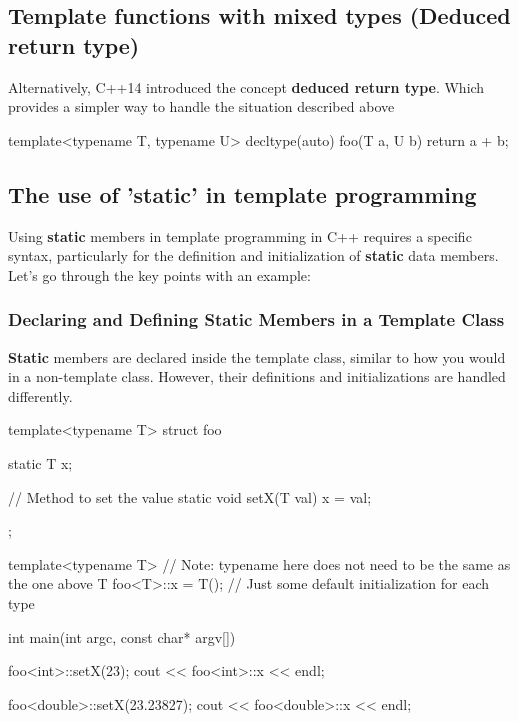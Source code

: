 \documentclass{report}
\begin{document}
\begin{concept}
    \pagebreak 
    \subsection{Template functions with mixed types (Deduced return type)}
    Alternatively, C++14 introduced the concept \textbf{deduced return type}. Which provides a simpler way to handle the situation described above
    \bigbreak \noindent 
    \begin{cppcode}
        template<typename T, typename U>
        decltype(auto) foo(T a, U b)  {
            return a + b;
        }
    \end{cppcode}
    
    \bigbreak \noindent 
    \subsection{The use of 'static' in template programming}
    \bigbreak \noindent 
    \begin{concept}
       Using \textbf{static} members in template programming in C++ requires a specific syntax, particularly for the definition and initialization of \textbf{static} data members. Let's go through the key points with an example:
    \end{concept}
    \bigbreak \noindent 
    \subsubsection{Declaring and Defining Static Members in a Template Class}
    \bigbreak \noindent 
    \textbf{Static} members are declared inside the template class, similar to how you would in a non-template class. However, their definitions and initializations are handled differently.
    \bigbreak \noindent 
    \begin{cppcode}
    template<typename T>
    struct foo {
        static T x; 

        // Method to set the value 
        static void setX(T val) {
            x = val;
        }
    };

    template<typename T> // Note: typename here does not need to be the same as the one above
    T foo<T>::x = T(); // Just some default initialization for each type

    int main(int argc, const char* argv[]) {

        foo<int>::setX(23);
        cout << foo<int>::x << endl;

        foo<double>::setX(23.23827);
        cout << foo<double>::x << endl;

}
\end{cppcode}
\end{concept}
\end{document}

